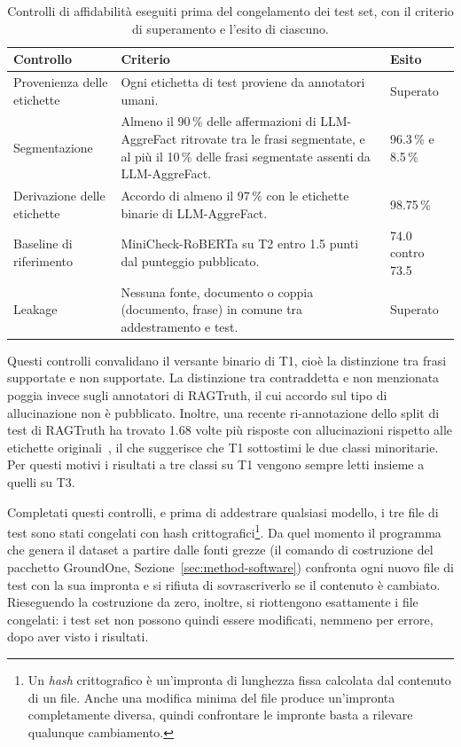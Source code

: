 \begin{table}[htbp]
\centering
\caption{Controlli di affidabilità eseguiti prima del congelamento dei test set, con il criterio di superamento e
l'esito di ciascuno.}
\label{tab:data-checks}
\small
\begin{tabularx}{\textwidth}{@{}lXl@{}}
\toprule
Controllo & Criterio & Esito \\
\midrule
Provenienza delle etichette & Ogni etichetta di test proviene da annotatori umani. & Superato \\
Segmentazione & Almeno il 90\,\% delle affermazioni di LLM-AggreFact ritrovate tra le frasi segmentate, e al più il 10\,\% delle frasi segmentate assenti da LLM-AggreFact. & 96.3\,\% e 8.5\,\% \\
Derivazione delle etichette & Accordo di almeno il 97\,\% con le etichette binarie di LLM-AggreFact. & 98.75\,\% \\
Baseline di riferimento & MiniCheck-RoBERTa su T2 entro 1.5 punti dal punteggio pubblicato. & 74.0 contro 73.5 \\
Leakage & Nessuna fonte, documento o coppia (documento, frase) in comune tra addestramento e test. & Superato \\
\bottomrule
\end{tabularx}
\end{table}

Questi controlli convalidano il versante binario di T1, cioè la distinzione tra frasi supportate e non supportate. La
distinzione tra contraddetta e non menzionata poggia invece sugli annotatori di RAGTruth, il cui accordo sul tipo di
allucinazione non è pubblicato. Inoltre, una recente ri-annotazione dello split di test di RAGTruth ha trovato 1.68
volte più risposte con allucinazioni rispetto alle etichette originali~\cite{yu2026retromorphic}, il che suggerisce che
T1 sottostimi le due classi minoritarie. Per questi motivi i risultati a tre classi su T1 vengono sempre letti insieme a
quelli su T3.

Completati questi controlli, e prima di addestrare qualsiasi modello, i tre file di test sono stati congelati con hash
crittografici\footnote{Un \emph{hash} crittografico è un'impronta di lunghezza fissa calcolata dal contenuto di un file.
Anche una modifica minima del file produce un'impronta completamente diversa, quindi confrontare le impronte basta a
rilevare qualunque cambiamento.}. Da quel momento il programma che genera il dataset a partire dalle fonti grezze (il
comando di costruzione del pacchetto GroundOne, Sezione~\ref{sec:method-software}) confronta ogni nuovo file di test con
la sua impronta e si rifiuta di sovrascriverlo se il contenuto è cambiato. Rieseguendo la costruzione da zero, inoltre,
si riottengono esattamente i file congelati: i test set non possono quindi essere modificati, nemmeno per errore, dopo
aver visto i risultati.

